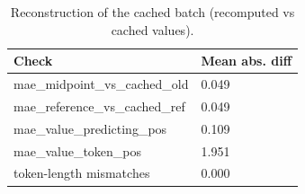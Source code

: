 \begin{table}[t]
\centering
\small
\caption{Reconstruction of the cached batch (recomputed vs cached values).}
\begin{tabular}{ll}
\toprule
Check & Mean abs. diff \\
\midrule
mae\_midpoint\_vs\_cached\_old & 0.049 \\
mae\_reference\_vs\_cached\_ref & 0.049 \\
mae\_value\_predicting\_pos & 0.109 \\
mae\_value\_token\_pos & 1.951 \\
token-length mismatches & 0.000 \\
\bottomrule
\end{tabular}
\end{table}
